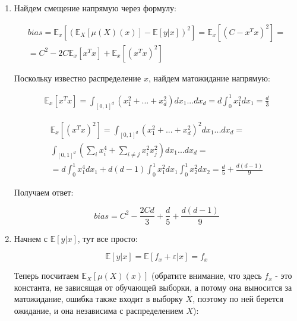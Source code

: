 \documentclass{article}
\begin{document}
\begin{enumerate}
    \item Найдем смещение напрямую через формулу:

    \small
    \begin{gather*}
        bias = \mathbb{E}_x \left[ {\left( \mathbb{E}_X \left[ \mu (X)(x) \right] - \mathbb{E}\left[ y | x \right] \right) }^2 \right] =
        \mathbb{E}_x \left[ {\left( C - x^T x \right) }^2 \right] = \\
        = C^2 - 2 C \mathbb{E}_x \left[ x^T x \right] + \mathbb{E}_x \left[ {(x^T x)}^2 \right]
    \end{gather*}
    \normalsize

    Поскольку известно распределение $ x $, найдем матожидание напрямую:

    \small
    \begin{gather*}
        \mathbb{E}_x \left[ x^T x \right] = \int_{{\left[ 0, 1 \right]}^d} (x_1^2 + ... + x_d^2) d x_1 ... d x_d = d \int_0^1 x_1^2 d x_1 =
        \frac{d}{3}
    \end{gather*}

    \begin{gather*}
        \mathbb{E}_x \left[ {(x^T x)}^2 \right] = \int_{{\left[ 0, 1 \right]}^d} {(x_1^2 + ... + x_d^2)}^2 d x_1 ... d x_d = \\
        \int_{{\left[ 0, 1 \right]}^d} \left( \sum_{i} x_i^4 + \sum_{i \ne j} x_i^2 x_j^2 \right) d x_1 ... d x_d = \\
         = d \int_0^1 x_1^4 d x_1 + d(d - 1) \int_0^1 x_1^2 d x_1 \int_0^1 x_2^2 d x_2 = \frac{d}{5} + \frac{d(d - 1)}{9}
    \end{gather*}
    \normalsize

    Получаем ответ:

    \begin{equation*}
        bias = C^2 - \frac{2Cd}{3} + \frac{d}{5} + \frac{d(d - 1)}{9}
    \end{equation*}

    \item Начнем с $ \mathbb{E}\left[ y | x \right] $, тут все просто:

    \begin{equation*}
        \mathbb{E}\left[ y | x \right] = \mathbb{E}[ f_x + \varepsilon | x ] = f_x
    \end{equation*}

    Теперь посчитаем $ \mathbb{E}_X \left[ \mu (X)(x) \right] $ (обратите внимание, что здесь $ f_x $ - это константа, не зависящая
    от обучающей выборки, а потому она выносится за матожидание, ошибка также входит в выборку $X$, поэтому по ней берется ожидание, и она независима с распределением $ X $):


\end{enumerate}
\end{document}
